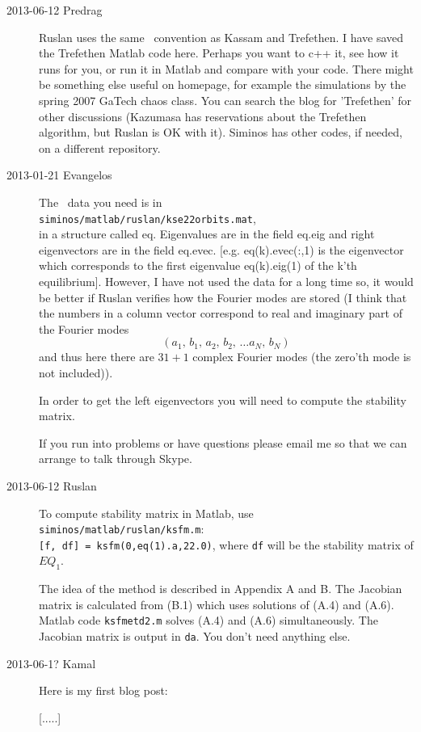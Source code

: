 \begin{description}
\item[2013-06-12 Predrag]
Ruslan uses the same \KSe\ convention as Kassam and
Trefethen. I have saved the Trefethen Matlab code
 {here}. Perhaps
you want to c++ it, see how it runs for you, or run it in Matlab and
compare with your code. There might be something else useful on
 homepage,
for example the simulations by the spring 2007 GaTech chaos class.
You can search the blog for 'Trefethen' for other discussions
(Kazumasa has reservations about the Trefethen algorithm,
but Ruslan is OK with it).
Siminos has other codes, if needed, on a different repository.


\item[2013-01-21 Evangelos] The \KS\ data you need is in \\
\texttt{siminos/matlab/ruslan/kse22orbits.mat},
\\
in a structure called eq.
Eigenvalues are in the field eq.eig and right eigenvectors are in the field eq.evec.
[e.g. eq(k).evec(:,1) is the eigenvector which corresponds to the first eigenvalue eq(k).eig(1)
of the k'th equilibrium]. However, I have not used the data for a long time so, it would
be better if Ruslan verifies how the Fourier modes are stored (I think that the numbers
in a column vector correspond to real and imaginary part of the Fourier modes
\[
 (a_1,\, b_1,\, a_2,\, b_2,\, \ldots a_N,\, b_N)
\]
and thus here there are $31+1$ complex Fourier modes (the zero'th mode is not included)).

In order to get the left eigenvectors you will need to compute the
stability matrix.

If you run into problems or have questions please email me so that we can arrange to talk through Skype.


\item[2013-06-12 Ruslan] To compute stability matrix in Matlab, use 
\\
\texttt{siminos/matlab/ruslan/ksfm.m}:
\\ {\tt [f, df] = ksfm(0,eq(1).a,22.0)}, where {\tt df} will be the stability matrix of $EQ_1$.

The idea of the method is described in  Appendix A and
B.  The Jacobian matrix is calculated from (B.1) which uses solutions
of (A.4) and (A.6).  Matlab code {\tt ksfmetd2.m} solves (A.4) and
(A.6) simultaneously.  The Jacobian matrix is output in {\tt da}.
You don't need anything else.  

\item[2013-06-1? Kamal] Here is my first blog post:

[.....]


\end{description}

\renewcommand{\ssp}{a}

